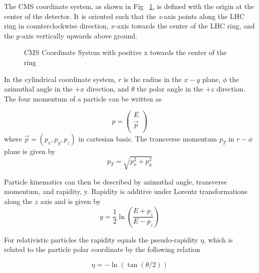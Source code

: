 The CMS coordinate system, as shown in Fig ~\ref{fig:CMS:Coordinate}, is defined with the origin at the center of the detector. It is oriented such that the $z$-axis points along the LHC ring in counterclockwise direction, $x$-axis towards the center of the LHC ring, and the $y$-axis vertically upwards above ground. 

\begin{figure}[htbp!]
\centering
{}
\caption{CMS Coordinate System with positive x towards the center of the ring} \label{fig:CMS:Coordinate}
\end{figure}


In the cylindrical coordinate system,  $r$ is the radius in the $x-y$ plane, $\phi$ the azimuthal
angle in the $+x$ direction, and $\theta$ the polar angle in the $+z$ direction. The four momentum of a particle can be written as

$$
p =   \begin{pmatrix}
    E\\
    \vec{p}\\
  \end{pmatrix}  
$$
where $\vec{p} = (p_{x}, p_{y}, p_{z})$ in cartesian basis. The transverse momentum $p_{T}$ in $r - \phi $ plane is given by 
$$ 
p_{T} = \sqrt{p_{x}^{2} + p_{y}^{2}}
$$

Particle kinematics can then be described by azimuthal angle, transverse momentum, and rapidity, y. Rapidity is additive under Lorentz transformations along the $z$ axis and is given by
$$
y = \frac{1}{2} \ln \left( \frac{E+p_{z}}{E-p_{z}} \right)
$$

For relativistic particles the rapidity equals the pseudo-rapidity $\eta$, which is related to the particle polar coordinate by the following relation

$$
\eta = -\ln(\tan(\theta/2))
$$


